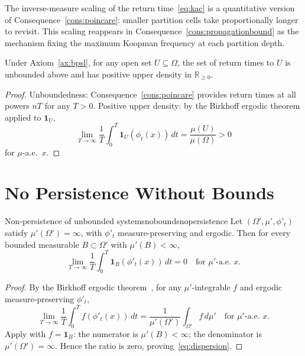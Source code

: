 \begin{remark}
The inverse-measure scaling of the return time~\eqref{eq:kac} is a
quantitative version of Consequence~\ref{cons:poincare}: smaller partition
cells take proportionally longer to revisit.
This scaling reappears in Consequence~\ref{cons:propagationbound} as the
mechanism fixing the maximum Koopman frequency at each partition depth.
\end{remark}

\begin{proposition}
\label{prop:densereturns}
Under Axiom~\ref{ax:bpsl}, for any open set $U\subseteq\Omega$, the set
of return times to $U$ is unbounded above and has positive upper density
in $\mathbb{R}_{\ge 0}$.
\end{proposition}

\begin{proof}
Unboundedness: Consequence~\ref{cons:poincare} provides return times at
all powers $nT$ for any $T>0$.
Positive upper density: by the Birkhoff ergodic theorem applied to
$\mathbf{1}_{U}$,
\begin{equation*}
  \lim_{T\to\infty}\frac{1}{T}\int_{0}^{T}
    \mathbf{1}_{U}(\phi_{t}(x))\,dt
  = \frac{\mu(U)}{\mu(\Omega)} > 0
\end{equation*}
for $\mu$-a.e.\ $x$.
\end{proof}

\section{No Persistence Without Bounds}
\label{sec:ch3-nopersistence}

\begin{consequence}{Non-persistence of unbounded systems}{noboundsnopersistence}
Let $(\Omega',\mu',\phi'_{t})$ satisfy $\mu'(\Omega')=\infty$, with
$\phi'_{t}$ measure-preserving and ergodic.
Then for every bounded measurable $B\subset\Omega'$ with
$\mu'(B)<\infty$,
\begin{equation}
  \lim_{T\to\infty}\frac{1}{T}\int_{0}^{T}
    \mathbf{1}_{B}(\phi'_{t}(x))\,dt = 0
  \quad\text{for $\mu'$-a.e.\ }x.
  \label{eq:dispersion}
\end{equation}
\end{consequence}

\begin{proof}
By the Birkhoff ergodic theorem~\citep{birkhoff1931,walters1982}, for
any $\mu'$-integrable $f$ and ergodic measure-preserving $\phi'_{t}$,
\begin{equation*}
  \lim_{T\to\infty}\frac{1}{T}\int_{0}^{T}f(\phi'_{t}(x))\,dt
  = \frac{1}{\mu'(\Omega')}\int_{\Omega'}f\,d\mu'
  \quad\text{for $\mu'$-a.e.\ }x.
\end{equation*}
Apply with $f=\mathbf{1}_{B}$: the numerator is $\mu'(B)<\infty$;
the denominator is $\mu'(\Omega')=\infty$.
Hence the ratio is zero, proving~\eqref{eq:dispersion}.
\end{proof}

